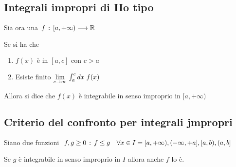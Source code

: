 \subsection{Integrali impropri di IIo tipo}

Sia ora una $f \, : \, [a,+\infty) \longrightarrow \mathbb{R}$

Se si ha che
\begin{enumerate}
	\item $f(x)$ è \Rint in $[a,c]$ con $c>a$
	\item Esiste finito $\underset{c \rightarrow \infty}{\lim} \, \int_{a}^{c} dx \; f(x)$ 
\end{enumerate}

Allora si dice che $f(x)$ è integrabile in senso improprio in $[a,+\infty)$ 

\begin{figure}[!htb]
\end{figure}
\begin{figure}[!htb]
\end{figure}

\newpage

\subsection{Criterio del confronto per integrali jmpropri}

Siano due funzioni $f,g\geq 0 \, : \, f \leq g \quad \forall x \in I=[a, + \infty), (-\infty, +a],[a,b) , (a,b]$  

Se $g$ è integrabile in senso improprio in $I$ allora anche $f$ lo è.

\begin{figure}[!htb]
\end{figure}
